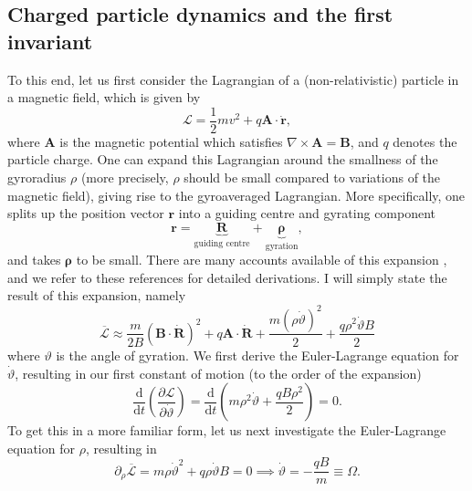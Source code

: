 \subsection*{Charged particle dynamics and the first invariant}
To this end, let us first consider the Lagrangian of a (non-relativistic) particle in a magnetic field, which is given by \cite[Sec.~16]{landau2013classical}
\begin{equation}
    \mathcal{L} = \frac{1}{2} m v^2 + q\boldsymbol{A} \cdot \dot{\boldsymbol{r}},
\end{equation}
where $\boldsymbol{A}$ is the magnetic potential which satisfies $\nabla \times \boldsymbol{A} = \boldsymbol{B}$, and $q$ denotes the particle charge. One can expand this Lagrangian around the smallness of the gyroradius $\rho$ (more precisely, $\rho$ should be small compared to variations of the magnetic field), giving rise to the gyroaveraged Lagrangian. More specifically, one splits up the position vector $\boldsymbol{r}$ into a guiding centre and gyrating component
\begin{equation}
    \boldsymbol{r} = \underbrace{\boldsymbol{R}}_{\text{guiding centre}} + \underbrace{\boldsymbol{\rho}}_{\text{gyration}},
\end{equation}
and takes $\boldsymbol{\rho}$ to be small. There are many accounts available of this expansion \cite{littlejohn1983variational,helander2005collisional,cary2009hamiltonian,rodriguez2022quasisymmetry}, and we refer to these references for detailed derivations. I will simply state the result of this expansion, namely
\begin{equation}
    \overline{\mathcal{L}} \approx \frac{m}{2B}\left( \boldsymbol{B} \cdot \dot{\boldsymbol{R}} \right)^2 + q \boldsymbol{A} \cdot \dot{\boldsymbol{R}} + \frac{m(\rho \dot{\vartheta})^2}{2} + \frac{q \rho^2 \dot{\vartheta} B}{2}
\end{equation}
where $\vartheta$ is the angle of gyration. We first derive the Euler-Lagrange equation for $\dot{\vartheta}$, resulting in our first constant of motion (to the order of the expansion)
\begin{equation}
    \frac{\mathrm{d}}{\mathrm{d} t} \left( \frac{\partial \mathcal{L}}{\partial \dot{\vartheta}} \right) = \frac{\mathrm{d}}{\mathrm{d} t} \left( m \rho^2 \dot{\vartheta} + \frac{q B \rho^2}{2} \right) = 0.
    \label{eq: mu-cons general}
\end{equation}
To get this in a more familiar form, let us next investigate the Euler-Lagrange equation for $\rho$, resulting in
\begin{equation}
    \partial_\rho \overline{\mathcal{L}} = m \rho \dot{\vartheta}^2 + q \rho \dot{\vartheta} B = 0 \implies \dot{\vartheta} = -\frac{qB}{m} \equiv \Omega.
\end{equation}
